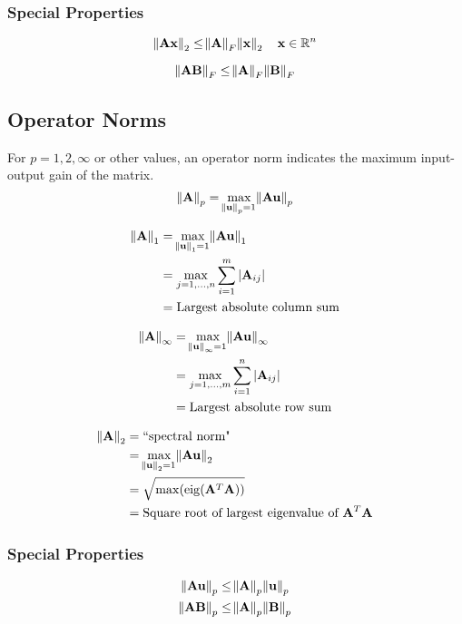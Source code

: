 \documentclass{book}
\newcommand{\mA}{\mathbf{A}}
\newcommand{\mB}{\mathbf{B}}
\newcommand{\vu}{\mathbf{u}}
\newcommand{\vx}{\mathbf{x}}
\DeclareMathOperator{\eig}{eig}
\newcommand{\sRn}{\mathbb{R}^{n}}
\begin{document}
\subsubsection{Special Properties}
\begin{equation}
\norm{\mA\vx}_2 \le \norm{\mA}_F \norm{\vx}_2~~~\vx\in\sRn
\end{equation}

\begin{equation}
\norm{\mA\mB}_F\le \norm{\mA}_F \norm{\mB}_F
\end{equation}

\subsection{Operator Norms}
For $p=1,2,\infty$ or other values, an operator norm indicates the maximum input-output gain of the matrix.
\begin{equation}
\norm{\mA}_p=\max_{\norm{\vu}_p=1} \norm{\mA\vu}_p
\end{equation}

\begin{align}
\norm{\mA}_1
  &=\max_{\norm{\vu}_1=1} \norm{\mA\vu}_1       \\
  &=\max_{j=1,\ldots,n} \sum_{i=1}^m |\mA_{ij}| \\
  &=\textrm{Largest absolute column sum}
\end{align}

\begin{align}
\norm{\mA}_\infty
  &=\max_{\norm{\vu}_\infty=1} \norm{\mA\vu}_\infty  \\
  &=\max_{j=1,\ldots,m} \sum_{i=1}^n |\mA_{ij}| \\
  &=\textrm{Largest absolute row sum}
\end{align}

\begin{align}
\norm{\mA}_2
  &=\textrm{``spectral norm"}                   \\
  &=\max_{\norm{\vu}_2=1} \norm{\mA\vu}_2       \\
  &=\sqrt{\max(\eig(\mA^T\mA))} \\
  &=\textrm{Square root of largest eigenvalue of~}\mA^T\mA
\end{align}



\subsubsection{Special Properties}
\begin{align}
\norm{\mA\vu}_p &\le \norm{\mA}_p \norm{\vu}_p \\
\norm{\mA\mB}_p &\le \norm{\mA}_p \norm{\mB}_p \\
\end{align}
\end{document}
